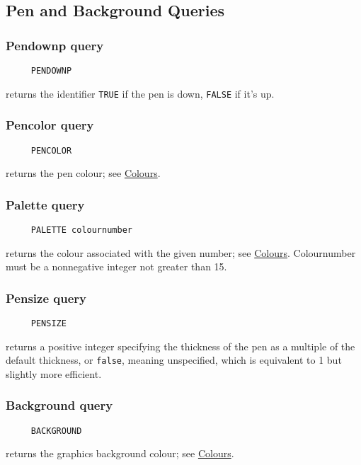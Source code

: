 \subsection{Pen and Background Queries}

\subsubsection*{Pendownp query}
\begin{verbatim}
     PENDOWNP
\end{verbatim}
returns the identifier \texttt{TRUE} if the pen is down,
\texttt{FALSE} if it's up.

\subsubsection*{Pencolor query}
\begin{verbatim}
     PENCOLOR
\end{verbatim}
\label{logoturtle:pencolor}
returns the pen colour; see \hyperref[logoturtle:Colours]{Colours}.

\subsubsection*{Palette query}
\begin{verbatim}
     PALETTE colournumber
\end{verbatim}
returns the colour associated with the given number; see
\hyperref[logoturtle:Colours]{Colours}.  Colournumber must be a
nonnegative integer not greater than 15.

\subsubsection*{Pensize query}
\begin{verbatim}
     PENSIZE
\end{verbatim}
returns a positive integer specifying the thickness of the pen as a
multiple of the default thickness, or \texttt{false}, meaning
unspecified, which is equivalent to 1 but slightly more efficient.

\subsubsection*{Background query}
\begin{verbatim}
     BACKGROUND
\end{verbatim}
returns the graphics background colour; see
\hyperref[logoturtle:Colours]{Colours}.


